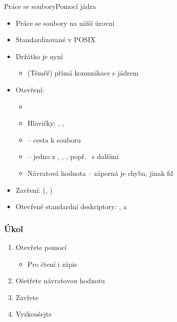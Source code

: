\begin{frame}{Práce se soubory}{Pomocí jádra}

  \begin{itemize}
    \item Práce se soubory na nižší úrovni
    \item Standardizované v POSIX

    \pause

    \item Držátko je nyní 
    \begin{itemize}
      \item (Téměř) přímá komunikace s jádrem
    \end{itemize}

    \pause

    \item Otevření: 
    \begin{itemize}
      \item {}
      \item Hlavičky: , ,
      \item {} -- cesta k souboru
      \item {} -- jedno z , ,
        , popř.\ \code{|} s dalšími
      \item Návratová hodnota -- záporná je chyba, jinak fd
    \end{itemize}

    \pause

    \item Zavření:  (,
      )

    \pause

    \item Otevřené standardní deskriptory: ,
       a 
  \end{itemize}

\end{frame}

\begin{frame}
  \frametitle{Úkol}

  \begin{enumerate}
    \item Otevřete pomocí  
    \begin{itemize}
      \item Pro čtení i zápis
    \end{itemize}
    \item Ošetřete návratovou hodnotu
    \item Zavřete
    \item Vyzkoušejte
  \end{enumerate}

\end{frame}

